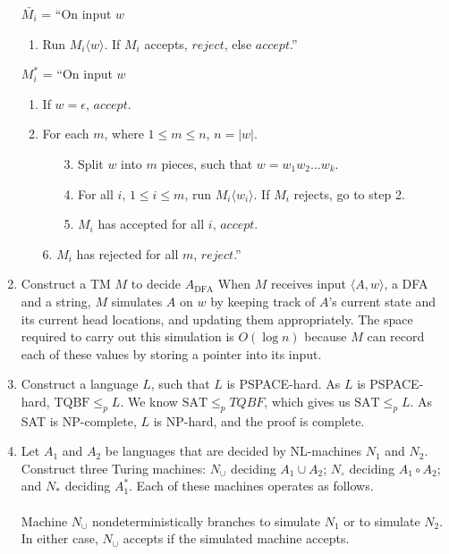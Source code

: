 \documentclass[11pt]{article}
\begin{document}
\begin{enumerate}[8.1]
  $\bar{M_i}$ = ``On input $w$
  \begin{enumerate}[label=\arabic*.]
  \item Run $M_i\langle w \rangle$. If $M_i$ accepts, $reject$, else $accept$.'' \\
  \end{enumerate}
  $M_i^*$ = ``On input $w$
  \begin{enumerate}[label=\arabic*.]
  \item If $w = \epsilon$, $accept$.
  \item For each $m$, where $1 \leq m \leq n$, $n = |w|$.
    \begin{enumerate}[label=\arabic*.]
    \item[3.] Split $w$ into $m$ pieces, such that $w = w_1w_2 \hdots w_k$.
    \item[4.] For all $i$, $1 \leq i \leq m$, run $M_i\langle w_i \rangle$. If $M_i$ rejects, go to step 2.
    \item[5.] $M_i$ has accepted for all $i$, $accept$.
    \end{enumerate}
  \item[6.] $M_i$ has rejected for all $m$, $reject$.'' \\
  \end{enumerate}
\item Construct a TM $M$ to decide $A_\text{DFA}$ When $M$ receives input $\langle A, w \rangle$, a DFA and a string, $M$ simulates $A$ on $w$ by keeping track of $A$'s current state and its current head locations, and updating them appropriately. The space required to carry out this simulation is $O(\log{n})$ because $M$ can record each of these values by storing a pointer into its input.
\item Construct a language $L$, such that $L$ is PSPACE-hard. As $L$ is PSPACE-hard, $\text{TQBF} \leq_p L$. We know $\text{SAT} \leq_p TQBF$, which gives us $\text{SAT} \leq_p L$. As SAT is NP-complete, $L$ is NP-hard, and the proof is complete.
\item Let $A_1$ and $A_2$ be languages that are decided by NL-machines $N_1$ and $N_2$. Construct three Turing machines: $N_\cup$ deciding $A_1 \cup A_2$; $N_\circ$ deciding $A_1 \circ A_2$; and $N_*$ deciding $A_1^*$. Each of these machines operates as follows. \\\\
  Machine $N_\cup$ nondeterministically branches to simulate $N_1$ or to simulate $N_2$. In either case, $N_\cup$ accepts if the simulated machine accepts. \\\\

\end{enumerate}
\end{document}

